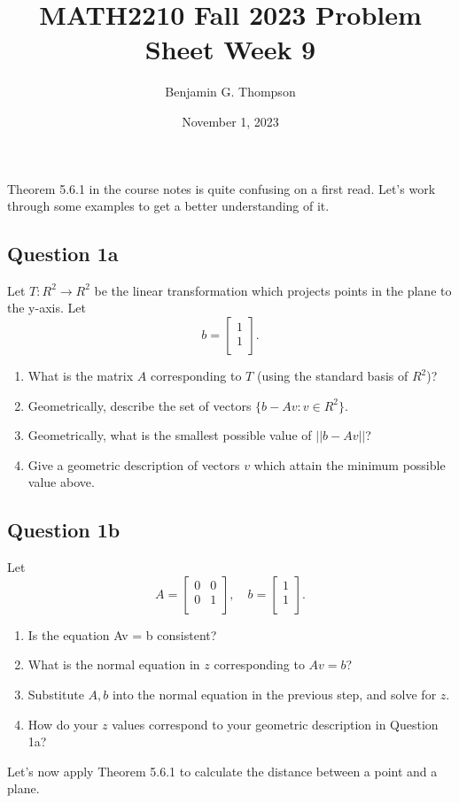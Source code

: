 \documentclass[12pt, a4paper]{article}
\title{MATH2210 Fall 2023 Problem Sheet Week 9}
\author{Benjamin G. Thompson}
\date{November 1, 2023}
\begin{document}
Theorem 5.6.1 in the course notes is quite confusing on a first read. Let's work through some examples to get a better understanding of it.
\subsection*{Question 1a}
Let $T : R^2 \rightarrow R^2$ be the linear transformation which projects points in the plane to the y-axis. Let
\[
b = \begin{bmatrix}
  1 \\
  1 \\
  \end{bmatrix}.
\]

\begin{enumerate}
\item What is the matrix $A$ corresponding to $T$ (using the standard basis of $R^2$)?
\item Geometrically, describe the set of vectors $\{ b - Av : v \in R^2\}$.
\item Geometrically, what is the smallest possible value of $||b - Av||$?
  \item Give a geometric description of vectors $v$ which attain the minimum possible value above.
\end{enumerate}

\subsection*{Question 1b}
Let
\[
A = \begin{bmatrix}
  0 & 0 \\
  0 & 1 \\
  \end{bmatrix}, \quad 
b = \begin{bmatrix}
  1 \\
  1 \\
  \end{bmatrix}.
\]
\begin{enumerate}
\item Is the equation Av = b consistent?
\item What is the normal equation in $z$ corresponding to $Av = b$?
\item Substitute $A, b$ into the normal equation in the previous step, and solve for $z$.
  \item How do your $z$ values correspond to your geometric description in Question 1a?
\end{enumerate}

Let's now apply Theorem 5.6.1 to calculate the distance between a point and a plane.
\end{document}
